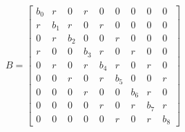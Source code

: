     \begin{equation}
        B = 
        \begin{bmatrix} 
            b_0 & r & 0 & r & 0 & 0 & 0 & 0 & 0 \\
            r & b_1 & r & 0 & r & 0 & 0 & 0 & 0 \\
            0 & r & b_2 & 0 & 0 & r & 0 & 0 & 0 \\
            r & 0 & 0 & b_3 & r & 0 & r & 0 & 0 \\
            0 & r & 0 & r & b_4 & r & 0 & r & 0 \\
            0 & 0 & r & 0 & r & b_5 & 0 & 0 & r \\
            0 & 0 & 0 & r & 0 & 0 & b_6 & r & 0 \\
            0 & 0 & 0 & 0 & r & 0 & r & b_7 & r \\
            0 & 0 & 0 & 0 & 0 & r & 0 & r & b_8
        \end{bmatrix}
    \end{equation}